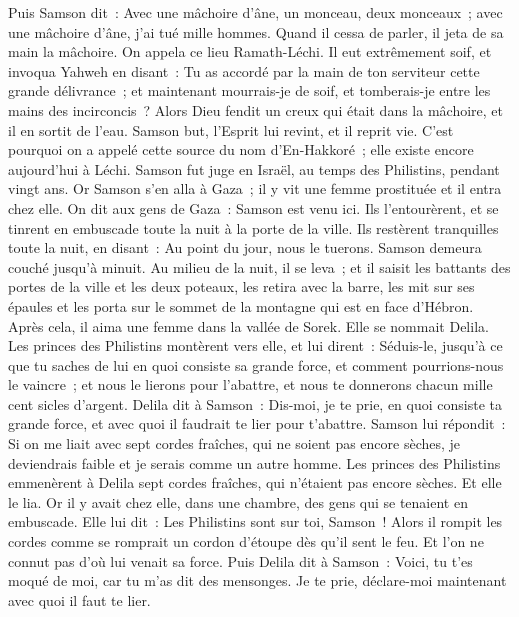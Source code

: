 \begin{multicols}{2}
Puis Samson dit~: Avec une mâchoire d'âne, un monceau, deux monceaux~; avec une mâchoire d'âne, j'ai tué mille hommes.
Quand il cessa de parler, il jeta de sa main la mâchoire. On appela ce lieu Ramath-Léchi.
Il eut extrêmement soif, et invoqua Yahweh en disant~: Tu as accordé par la main de ton serviteur cette grande délivrance~; et maintenant mourrais-je de soif, et tomberais-je entre les mains des incirconcis~?
Alors Dieu fendit un creux qui était dans la mâchoire, et il en sortit de l'eau. Samson but, l'Esprit lui revint, et il reprit vie. C'est pourquoi on a appelé cette source du nom d'En-Hakkoré~; elle existe encore aujourd'hui à Léchi.
Samson fut juge en Israël, au temps des Philistins, pendant vingt ans.
\VerseOne{}Or Samson s'en alla à Gaza~; il y vit une femme prostituée et il entra chez elle.
On dit aux gens de Gaza~: Samson est venu ici. Ils l'entourèrent, et se tinrent en embuscade toute la nuit à la porte de la ville. Ils restèrent tranquilles toute la nuit, en disant~: Au point du jour, nous le tuerons.
Samson demeura couché jusqu'à minuit. Au milieu de la nuit, il se leva~; et il saisit les battants des portes de la ville et les deux poteaux, les retira avec la barre, les mit sur ses épaules et les porta sur le sommet de la montagne qui est en face d'Hébron.
Après cela, il aima une femme dans la vallée de Sorek. Elle se nommait Delila.
Les princes des Philistins montèrent vers elle, et lui dirent~: Séduis-le, jusqu'à ce que tu saches de lui en quoi consiste sa grande force, et comment pourrions-nous le vaincre~; et nous le lierons pour l'abattre, et nous te donnerons chacun mille cent sicles d'argent.
Delila dit à Samson~: Dis-moi, je te prie, en quoi consiste ta grande force, et avec quoi il faudrait te lier pour t'abattre.
Samson lui répondit~: Si on me liait avec sept cordes fraîches, qui ne soient pas encore sèches, je deviendrais faible et je serais comme un autre homme.
Les princes des Philistins emmenèrent à Delila sept cordes fraîches, qui n'étaient pas encore sèches. Et elle le lia.
Or il y avait chez elle, dans une chambre, des gens qui se tenaient en embuscade. Elle lui dit~: Les Philistins sont sur toi, Samson~! Alors il rompit les cordes comme se romprait un cordon d'étoupe dès qu'il sent le feu. Et l'on ne connut pas d'où lui venait sa force.
Puis Delila dit à Samson~: Voici, tu t'es moqué de moi, car tu m'as dit des mensonges. Je te prie, déclare-moi maintenant avec quoi il faut te lier.

\end{multicols}
